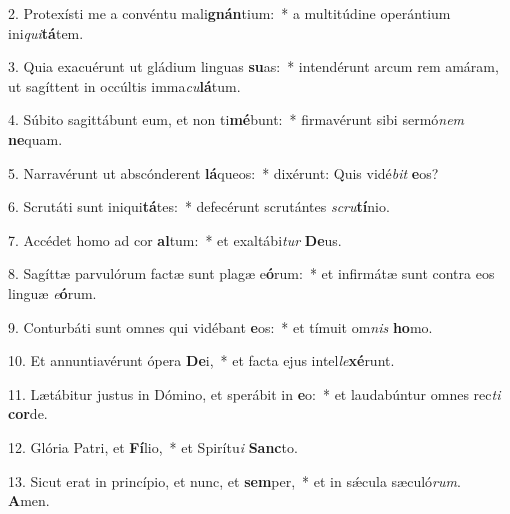 2. Protexísti me a convéntu mali\textbf{gnán}tium:~*  a multitúdine operántium ini\textit{qui}\textbf{tá}tem.\

3. Quia exacuérunt ut gládium linguas \textbf{su}as:~*  intendérunt arcum rem amáram, ut sagíttent in occúltis imma\textit{cu}\textbf{lá}tum.\

4. Súbito sagittábunt eum, et non ti\textbf{mé}bunt:~*  firmavérunt sibi sermó\textit{nem} \textbf{ne}quam.\

5. Narravérunt ut abscónderent \textbf{lá}queos:~*  dixérunt: Quis vidé\textit{bit} \textbf{e}os?\

6. Scrutáti sunt iniqui\textbf{tá}tes:~*  defecérunt scrutántes \textit{scru}\textbf{tí}nio.\

7. Accédet homo ad cor \textbf{al}tum:~*  et exaltábi\textit{tur} \textbf{De}us.\

8. Sagíttæ parvulórum factæ sunt plagæ e\textbf{ó}rum:~*  et infirmátæ sunt contra eos linguæ \textit{e}\textbf{ó}rum.\

9. Conturbáti sunt omnes qui vidébant \textbf{e}os:~*  et tímuit om\textit{nis} \textbf{ho}mo.\

10. Et annuntiavérunt ópera \textbf{De}i,~*  et facta ejus intel\textit{le}\textbf{xé}runt.\

11. Lætábitur justus in Dómino, et sperábit in \textbf{e}o:~*  et laudabúntur omnes rec\textit{ti} \textbf{cor}de.\

12. Glória Patri, et \textbf{Fí}lio,~*  et Spirítu\textit{i} \textbf{Sanc}to.\

13. Sicut erat in princípio, et nunc, et \textbf{sem}per,~*  et in sǽcula sæculó\textit{rum}. \textbf{A}men.\

